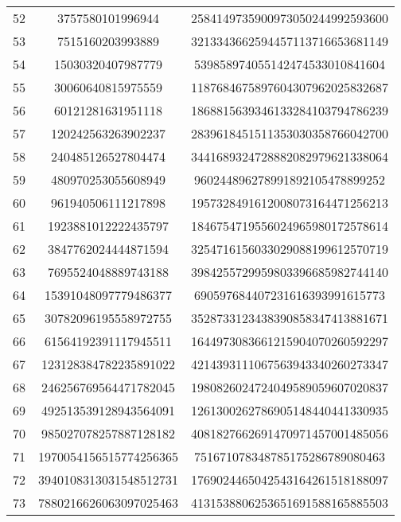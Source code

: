 \documentclass[fleqn]{article}
\begin{document}
\begin{center}
\begin{tabular}{c | c | c}
        \end{tabular}
        \newpage
        \begin{tabular}{c | c | c}
            52 & 3757580101996944 & 2584149735900973050244992593600 \\
            53 & 7515160203993889 & 3213343662594457113716653681149 \\
            54 & 15030320407987779 & 539858974055142474533010841604 \\
            55 & 30060640815975559 & 1187684675897604307962025832687 \\
            56 & 60121281631951118 & 1868815639346133284103794786239 \\
            57 & 120242563263902237 & 2839618451511353030358766042700 \\
            58 & 240485126527804474 & 3441689324728882082979621338064 \\
            59 & 480970253055608949 & 960244896278991892105478899252 \\
            60 & 961940506111217898 & 1957328491612008073164471256213 \\
            61 & 1923881012222435797 & 1846754719556024965980172578614 \\
            62 & 3847762024444871594 & 3254716156033029088199612570719 \\
            63 & 7695524048889743188 & 3984255729959803396685982744140 \\
            64 & 15391048097779486377 & 690597684407231616393991615773 \\
            65 & 30782096195558972755 & 3528733123438390858347413881671 \\
            66 & 61564192391117945511 & 1644973083661215904070260592297 \\
            67 & 123128384782235891022 & 4214393111067563943340260273347 \\
            68 & 246256769564471782045 & 1980826024724049589059607020837 \\
            69 & 492513539128943564091 & 1261300262786905148440441330935 \\
            70 & 985027078257887128182 & 4081827662691470971457001485056 \\
            71 & 1970054156515774256365 & 751671078348785175286789080463 \\
            72 & 3940108313031548512731 & 1769024465042543164261518188097 \\
            73 & 7880216626063097025463 & 4131538806253651691588165885503 \\

\end{tabular}
\end{center}
\end{document}
